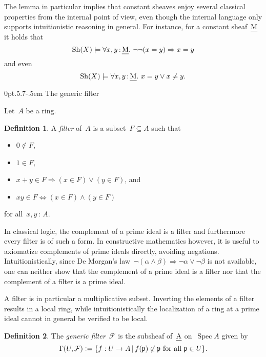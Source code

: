 \documentclass[10pt,reqno,a4paper]{amsbook}
\makeatletter
\theoremstyle{definition}
\newtheorem{defn}{Definition}[section]
\theoremstyle{plain}
\theoremstyle{remark}
\newcommand{\F}{\mathcal{F}}
\newcommand{\ppp}{\mathfrak{p}}
\let\oldul\ul
\renewcommand{\ul}[1]{\text{\oldul{$#1$}}}
\newcommand{\Sh}{\mathrm{Sh}}
\DeclareMathOperator{\Spec}{Spec}
\newcommand{\?}{\,{:}\,}
\renewcommand{\_}{\mathpunct{.}\,}
\newcommand{\defeq}{\vcentcolon=}
\def\subsection{\@startsection{subsection}{2}%
  {0pt}{.5\linespacing\@plus.7\linespacing}{-.5em}%
  {\normalfont\bfseries}}
\makeatother
\begin{document}
The lemma in particular implies that constant sheaves enjoy several
classical properties from the internal point of view, even though the internal
language only supports intuitionistic reasoning in general. For instance, for a
constant sheaf~$\ul{M}$ it holds that
\[ \Sh(X) \models \forall x,y\?\ul{M}\_ \neg\neg(x = y) \Rightarrow x = y \]
and even
\[ \Sh(X) \models \forall x,y\?\ul{M}\_ x = y \vee x \neq y. \]


\subsection{The generic filter}
\label{sect:generic-filter}

Let~$A$ be a ring.

\begin{defn}\label{defn:filter}
A \emph{filter} of~$A$ is a subset~$F \subseteq A$ such that
\begin{itemize}
\item $0 \not\in F$,
\item $1 \in F$,
\item $x + y \in F \Longrightarrow (x \in F) \vee (y \in F)$, and
\item $xy \in F \Longleftrightarrow (x \in F) \wedge (y \in F)$
\end{itemize}
for all~$x,y \? A$.
\end{defn}

In classical logic, the complement of a prime ideal is a filter and
furthermore every filter is of such a form. In constructive mathematics however,
it is useful to axiomatize complements of prime ideals directly, avoiding
negations. Intuitionistically, since De Morgan's law~$\neg(\alpha \wedge \beta)
\Rightarrow \neg\alpha \vee \neg\beta$ is not available, one can neither show
that the complement of a prime ideal is a filter nor that the complement of a
filter is a prime ideal.

A filter is in particular a multiplicative subset. Inverting the
elements of a filter results in a local ring, while intuitionistically
the localization of a ring at a prime ideal cannot in general be verified to be local.

\begin{defn}The \emph{generic filter}~$\F$ is the subsheaf of~$\ul{A}$
on~$\Spec A$ given by
\[ \Gamma(U, \F) \defeq \{ f : U \to A \,|\,
  \text{$f(\ppp) \not\in \ppp$ for all $\ppp \in U$} \}. \]
\end{defn}
\end{document}
